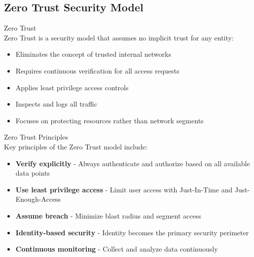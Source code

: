\subsection{Zero Trust Security Model}

\begin{definition}{Zero Trust}\\
Zero Trust is a security model that assumes no implicit trust for any entity:
\begin{itemize}
    \item Eliminates the concept of trusted internal networks
    \item Requires continuous verification for all access requests
    \item Applies least privilege access controls
    \item Inspects and logs all traffic
    \item Focuses on protecting resources rather than network segments
\end{itemize}
\end{definition}

\begin{concept}{Zero Trust Principles}\\
Key principles of the Zero Trust model include:
\begin{itemize}
    \item \textbf{Verify explicitly} - Always authenticate and authorize based on all available data points
    \item \textbf{Use least privilege access} - Limit user access with Just-In-Time and Just-Enough-Access
    \item \textbf{Assume breach} - Minimize blast radius and segment access
    \item \textbf{Identity-based security} - Identity becomes the primary security perimeter
    \item \textbf{Continuous monitoring} - Collect and analyze data continuously
\end{itemize}
\end{concept}

